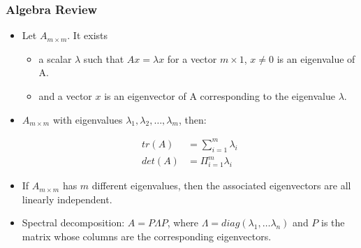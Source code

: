 \documentclass[
  shownotes,
  xcolor={svgnames},
  hyperref={colorlinks,citecolor=DarkBlue,linkcolor=DarkRed,urlcolor=DarkBlue}
  , aspectratio=169]{beamer}
\begin{document}
\begin{frame}
\frametitle{Algebra Review}

\begin{itemize}

\item Let $A_{m\times m}$. It exists 
\begin{itemize}
  \item a scalar $\lambda$ such that $Ax = \lambda x$ for a vector $m\times 1$, $x \neq 0$ is an eigenvalue of A. 
  \item and a vector $x$ is an eigenvector of A corresponding to the eigenvalue $\lambda$.
\end{itemize}

\item $A_{m\times m}$ with eigenvalues $\lambda_1, \lambda_2,\dots,\lambda_m$, then:

\begin{align}
tr(A) &= \sum_{i=1}^m \lambda_i \\
det(A) &= \Pi_{i=1}^m \lambda_i
\end{align}

\item If $A_{m\times m}$ has $m$ different eigenvalues, then the associated eigenvectors are all linearly independent.
\item Spectral decomposition: $A = P\Lambda P$, where $\Lambda = diag(\lambda_1, \dots \lambda_n )$ and $P$ is the matrix whose columns are the corresponding eigenvectors.
\end{itemize}

\end{frame}
\end{document}
